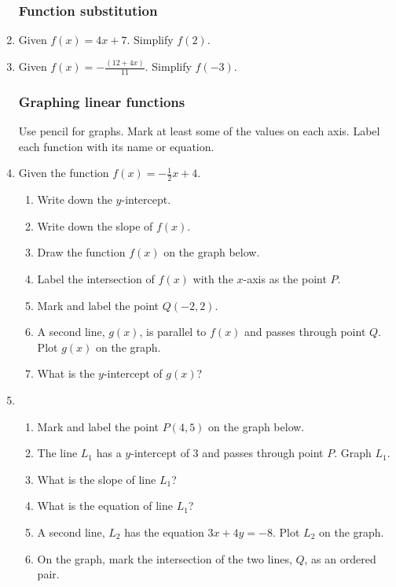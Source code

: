 \documentclass[12pt, oneside]{article}
\begin{document}
\begin{enumerate}
\subsubsection*{Function substitution}
\item Given $f(x)=4x+7$. Simplify $f(2)$. \vspace{4cm}
\item Given $\displaystyle f(x)=-\frac{(12+4x)}{11}$. Simplify $f(-3)$.

\newpage
\subsubsection*{Graphing linear functions}
Use pencil for graphs. Mark at least some of the values on each axis. Label each function with its name or equation.
\item Given the function $f(x)=-\frac{1}{2}x+4$.
\begin{enumerate}
    \item Write down the $y$-intercept. \bigskip
    \item Write down the slope of $f(x)$. \bigskip
    \item Draw the function $f(x)$ on the graph below.
    \item Label the intersection of $f(x)$ with the $x$-axis as the point $P$.
    \item Mark and label the point $Q (-2, 2)$.
    \item A second line, $g(x)$, is parallel to $f(x)$ and passes through point $Q$. Plot $g(x)$ on the graph.
    \item What is the $y$-intercept of $g(x)$? \bigskip
\end{enumerate}

\begin{center} %
\end{center}

\newpage
\item
  \begin{enumerate}
    \item Mark and label the point $P(4, 5)$ on the graph below.
    \item The line $L_1$ has a $y$-intercept of 3 and passes through point $P$. Graph $L_1$.
    \item What is the slope of line $L_1$? \vspace{2cm}
    \item What is the equation of line $L_1$? \vspace{2cm}
    \item A second line, $L_2$ has the equation $3x+4y=-8$. Plot $L_2$ on the graph.
    \item On the graph, mark the intersection of the two lines, $Q$, as an ordered pair.
  \end{enumerate}


\end{enumerate}
\end{document}
